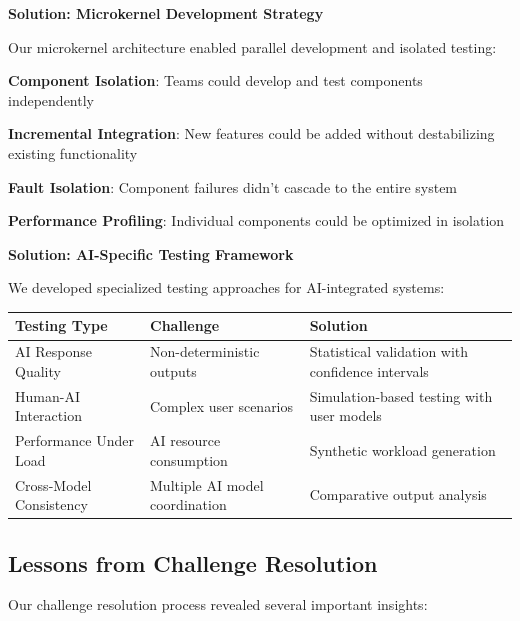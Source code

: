 \textbf{Solution: Microkernel Development Strategy}

Our microkernel architecture enabled parallel development and isolated testing:

\begin{compactlist}
    \item \textbf{Component Isolation}: Teams could develop and test components independently
    \item \textbf{Incremental Integration}: New features could be added without destabilizing existing functionality
    \item \textbf{Fault Isolation}: Component failures didn't cascade to the entire system
    \item \textbf{Performance Profiling}: Individual components could be optimized in isolation
\end{compactlist}

\textbf{Solution: AI-Specific Testing Framework}

We developed specialized testing approaches for AI-integrated systems:

\begin{center}
\begin{tabular}{@{}lll@{}}
\toprule
\textbf{Testing Type} & \textbf{Challenge} & \textbf{Solution} \\
\midrule
AI Response Quality & Non-deterministic outputs & Statistical validation with confidence intervals \\
Human-AI Interaction & Complex user scenarios & Simulation-based testing with user models \\
Performance Under Load & AI resource consumption & Synthetic workload generation \\
Cross-Model Consistency & Multiple AI model coordination & Comparative output analysis \\
\bottomrule
\end{tabular}
\end{center}

\subsection*{Lessons from Challenge Resolution}

Our challenge resolution process revealed several important insights:

